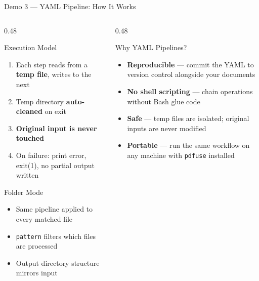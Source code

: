 \documentclass[aspectratio=169]{beamer}
\begin{document}
\begin{frame}{Demo 3 --- YAML Pipeline: How It Works}
  \begin{columns}[T]
    \begin{column}{0.48\textwidth}
      \begin{block}{Execution Model}
        \begin{enumerate}
          \item Each step reads from a \textbf{temp file},
                writes to the next
          \item Temp directory \textbf{auto-cleaned} on exit
          \item \textbf{Original input is never touched}
          \item On failure: print error, exit(1),
                no partial output written
        \end{enumerate}
      \end{block}
      \vspace{4pt}
      \begin{block}{Folder Mode}
        \begin{itemize}
          \item Same pipeline applied to every matched file
          \item \texttt{pattern} filters which files are processed
          \item Output directory structure mirrors input
        \end{itemize}
      \end{block}
    \end{column}
    \begin{column}{0.48\textwidth}
      \begin{block}{Why YAML Pipelines?}
        \begin{itemize}
          \item \textbf{Reproducible} --- commit the YAML to version
                control alongside your documents
          \vspace{4pt}
          \item \textbf{No shell scripting} --- chain operations
                without Bash glue code
          \vspace{4pt}
          \item \textbf{Safe} --- temp files are isolated; original
                inputs are never modified
          \vspace{4pt}
          \item \textbf{Portable} --- run the same workflow on any
                machine with \texttt{pdfuse} installed
        \end{itemize}
      \end{block}
    \end{column}
  \end{columns}
\end{frame}
\end{document}
